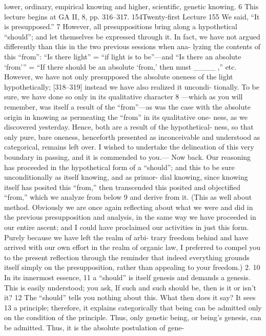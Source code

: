 lower, ordinary, empirical knowing and higher, scientific, genetic knowing. 6
This lecture begins at GA II, 8, pp. 316–317.
154Twenty-first Lecture
155
We said, “It is presupposed.” 7 However, all presuppositions bring along a
hypothetical “should”; and let themselves be expressed through it. In fact, we
have not argued differently than this in the two previous sessions when ana-
lyzing the contents of this “from”: “Is there light” = “if light is to be”—and “Is
there an absolute ‘from’” = “If there should be an absolute ‘from,’ then must
____ ,” etc. However, we have not only presupposed the absolute oneness of
the light hypothetically; [318–319] instead we have also realized it uncondi-
tionally. To be sure, we have done so only in its qualitative character 8 —which
as you will remember, was itself a result of the “from”—as was the case with
the absolute origin in knowing as permeating the “from” in its qualitative one-
ness, as we discovered yesterday. Hence, both are a result of the hypothetical-
ness, so that only pure, bare oneness, henceforth presented as inconceivable
and understood as categorical, remains left over. I wished to undertake the
delineation of this very boundary in passing, and it is commended to you.—
Now back. Our reasoning has proceeded in the hypothetical form of a
“should”; and this to be sure unconditionally as itself knowing, and as primor-
dial knowing, since knowing itself has posited this “from,” then transcended
this posited and objectified “from,” which we analyze from below 9 and derive
from it.
(This as well about method. Obviously we are once again reflecting
about what we were and did in the previous presupposition and analysis, in the
same way we have proceeded in our entire ascent; and I could have proclaimed
our activities in just this form. Purely because we have left the realm of arbi-
trary freedom behind and have arrived with our own effort in the realm of
organic law, I preferred to compel you to the present reflection through the
reminder that indeed everything grounds itself simply on the presupposition,
rather than appealing to your freedom.)
2. 10 In its innermost essence, 11 a “should” is itself genesis and demands a
genesis. This is easily understood; you ask, If such and such should be, then is
it or isn’t it? 12 The “should” tells you nothing about this. What then does it say?
It sees 13 a principle; therefore, it explains categorically that being can be
admitted only on the condition of the principle. Thus, only genetic being, or
being’s genesis, can be admitted. Thus, it is the absolute postulation of gene-
